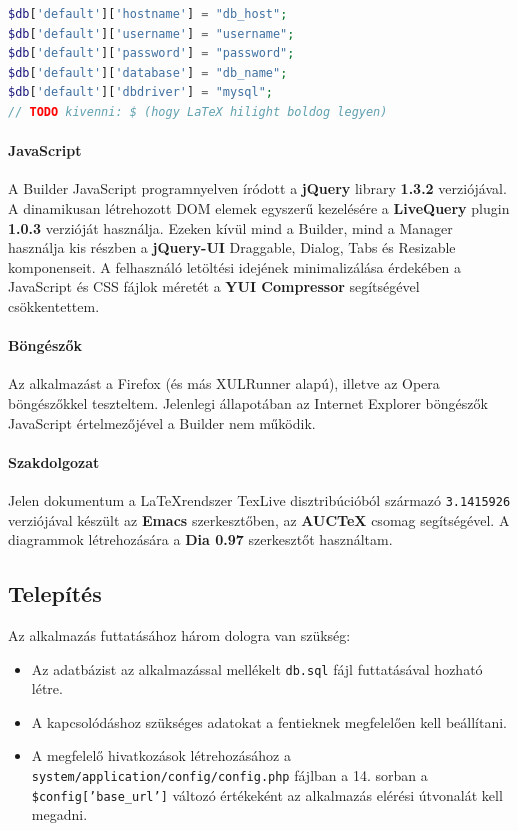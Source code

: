 \documentclass[12pt,a4paper,twoside]{article}
\begin{document}
\begin{lstlisting}[language=PHP, firstnumber=40]
$db['default']['hostname'] = "db_host";
$db['default']['username'] = "username";
$db['default']['password'] = "password";
$db['default']['database'] = "db_name";
$db['default']['dbdriver'] = "mysql";
// TODO kivenni: $ (hogy LaTeX hilight boldog legyen)
\end{lstlisting}

\paragraph{JavaScript}
A Builder JavaScript programnyelven íródott a \textbf{jQuery}\cite{JQ} library
\textbf{1.3.2} verziójával. A dinamikusan létrehozott DOM elemek egyszerű
kezelésére a \textbf{LiveQuery}\cite{JQ-LiveQuery} plugin \textbf{1.0.3}
verzióját használja. Ezeken kívül mind a Builder, mind a Manager használja
kis részben a \textbf{jQuery-UI}\cite{JQ-UI} Draggable, Dialog, Tabs és
Resizable komponenseit. A felhasználó letöltési idejének minimalizálása
érdekében a JavaScript és CSS fájlok méretét a \textbf{YUI Compressor}\cite{YUI}
segítségével csökkentettem.

\paragraph{Böngészők}
Az alkalmazást a Firefox (és más XULRunner alapú), illetve az Opera böngészőkkel
teszteltem. Jelenlegi állapotában az Internet Explorer böngészők JavaScript
értelmezőjével a Builder nem működik.

\paragraph{Szakdolgozat}
Jelen dokumentum a \LaTeX  rendszer TexLive disztribúcióból származó
\texttt{3.1415926} verziójával készült az \textbf{Emacs} szerkesztőben, az
\textbf{AUCTeX} csomag segítségével. A diagrammok létrehozására a \textbf{Dia 0.97}
szerkesztőt használtam.

\subsection{Telepítés}
Az alkalmazás futtatásához három dologra van szükség:

\begin{itemize}
\item Az adatbázist az alkalmazással mellékelt \texttt{db.sql} fájl futtatásával
  hozható létre.
\item A kapcsolódáshoz szükséges adatokat a fentieknek megfelelően
  kell beállítani.
\item A megfelelő hivatkozások létrehozásához a
  \texttt{system/application/config/config.php} fájlban a 14. sorban a
  \texttt{\$config['base\_url']} változó értékeként az alkalmazás elérési
  útvonalát kell megadni.
\end{itemize}
\end{document}
